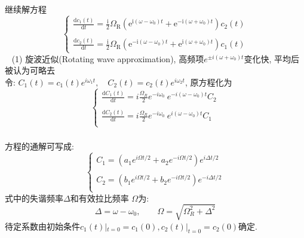 \begin{frame} 
\frametitle{}
{\Bullet} 继续解方程
\[ \begin{cases}
    \frac{\mathrm{d}c_1(t)}{\mathrm{d}t}=\frac{\mathrm{i}}{2} \Omega_{\mathrm{R}}\left(\mathrm{e}^{\mathrm{i}\left(\omega-\omega_{0}\right) t}+\mathrm{e}^{-\mathrm{i}\left(\omega+\omega_{0}\right) t}\right) c_{2}(t) \\ 
    ~\\
    \frac{\mathrm{d}c_2(t)}{\mathrm{d}t}=\frac{\mathrm{i}}{2} \Omega_{\mathrm{R}}\left(\mathrm{e}^{-\mathrm{i}\left(\omega-\omega_{0}\right) t}+\mathrm{e}^{\mathrm{i}\left(\omega+\omega_{0}\right) t}\right) c_{1}(t)
 \end{cases} \]
 \解~ (1) 旋波近似(Rotating wave approximation), 高频项$e^{\pm i(\omega+\omega_0) t}$变化快, 平均后被认为可略去 \\ {\vspace*{0.3em}} 令: $C_1(t) = c_1(t) e^{i \omega_1 t}, \quad C_2(t) = c_2(t) e^{i \omega_2 t} $, 原方程化为
\[ \begin{cases}
    \frac{\mathrm{d}C_1(t)}{\mathrm{d}t}= i \frac{\Omega_R}{2} e^{-i \omega_0} ~e^{ -i(\omega-\omega_0) t} C_2 \\ 
    ~\\
    \frac{\mathrm{d}C_2(t)}{\mathrm{d}t}= i \frac{\Omega_R }{2} e^{-i \omega_0} ~e^{ i(\omega-\omega_0) t} C_1 \\ 
    \end{cases} \]
\end{frame}

\begin{frame} 
\frametitle{}
    方程的通解可写成:
    \[ \begin{cases}
        C_1 = (a_1e^{i\Omega t /2} + a_2 e^{-i\Omega t /2}) e^{i \Delta t /2} \\ 
        ~\\ 
        C_2 = (b_1e^{i\Omega t /2} + b_2 e^{-i\Omega t /2}) e^{-i \Delta t /2} \\ 
        \end{cases} \] 
    式中的失谐频率$\Delta$和有效拉比频率 $\Omega$为:
    \[ \Delta = \omega - \omega_0, \qquad \Omega= \sqrt{\Omega^2 _R + \Delta^2}\]
    待定系数由初始条件$c_1(t)|_{t=0} = c_1(0),c_2(t)|_{t=0} = c_2(0)$确定. 
\end{frame}

